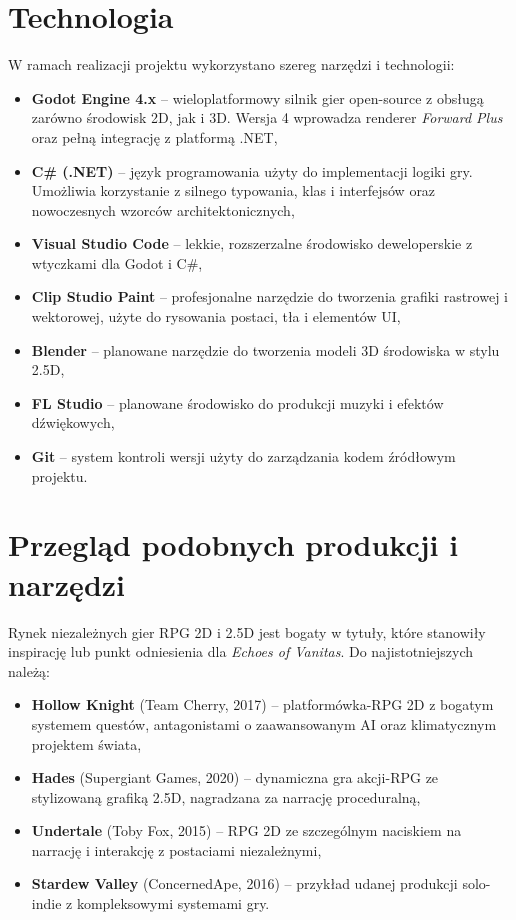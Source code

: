 \section{Technologia}

W ramach realizacji projektu wykorzystano szereg narzędzi i technologii:

\begin{itemize}
    \item \textbf{Godot Engine 4.x} – wieloplatformowy silnik gier open-source z obsługą zarówno środowisk 2D, jak i 3D. Wersja 4 wprowadza renderer \textit{Forward Plus} oraz pełną integrację z platformą .NET,
    \item \textbf{C\# (.NET)} – język programowania użyty do implementacji logiki gry. Umożliwia korzystanie z silnego typowania, klas i interfejsów oraz nowoczesnych wzorców architektonicznych,
    \item \textbf{Visual Studio Code} – lekkie, rozszerzalne środowisko deweloperskie z wtyczkami dla Godot i C\#,
    \item \textbf{Clip Studio Paint} – profesjonalne narzędzie do tworzenia grafiki rastrowej i wektorowej, użyte do rysowania postaci, tła i elementów UI,
    \item \textbf{Blender} – planowane narzędzie do tworzenia modeli 3D środowiska w stylu 2.5D,
    \item \textbf{FL Studio} – planowane środowisko do produkcji muzyki i efektów dźwiękowych,
    \item \textbf{Git} – system kontroli wersji użyty do zarządzania kodem źródłowym projektu.
\end{itemize}

\section{Przegląd podobnych produkcji i narzędzi}

Rynek niezależnych gier RPG 2D i 2.5D jest bogaty w tytuły, które stanowiły inspirację lub punkt odniesienia dla \textit{Echoes of Vanitas}. Do najistotniejszych należą:

\begin{itemize}
    \item \textbf{Hollow Knight} (Team Cherry, 2017) – platformówka-RPG 2D z bogatym systemem questów, antagonistami o zaawansowanym AI oraz klimatycznym projektem świata,
    \item \textbf{Hades} (Supergiant Games, 2020) – dynamiczna gra akcji-RPG ze stylizowaną grafiką 2.5D, nagradzana za narrację proceduralną,
    \item \textbf{Undertale} (Toby Fox, 2015) – RPG 2D ze szczególnym naciskiem na narrację i interakcję z postaciami niezależnymi,
    \item \textbf{Stardew Valley} (ConcernedApe, 2016) – przykład udanej produkcji solo-indie z kompleksowymi systemami gry.
\end{itemize}

